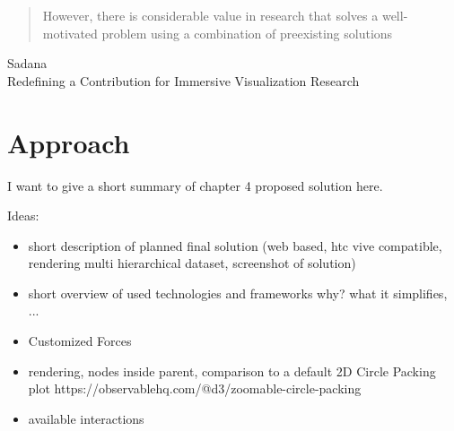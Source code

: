 \begin{quotation}
    However, there is considerable value in research that
    solves a well-motivated problem using a combination
    of preexisting solutions 
\end{quotation}
Sadana\\
Redefining a Contribution for Immersive Visualization Research\\

\section{Approach}

I want to give a short summary of chapter 4 proposed solution here. 

Ideas:
\begin{itemize}
    \item short description of planned final solution (web based, htc vive compatible, rendering multi hierarchical dataset, screenshot of solution)  
    \item short overview of used technologies and frameworks why? what it simplifies, ... 
    \item Customized Forces
    \item rendering, nodes inside parent, comparison to a default 2D Circle Packing plot https://observablehq.com/@d3/zoomable-circle-packing 
    \item available interactions
\end{itemize}